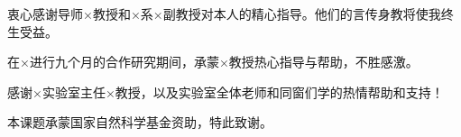 \begin{acknowledgements}

衷心感谢导师×教授和×系×副教授对本人的精心指导。他们的言传身教将使我终生受益。

在×进行九个月的合作研究期间，承蒙×教授热心指导与帮助，不胜感激。

感谢×实验室主任×教授，以及实验室全体老师和同窗们学的热情帮助和支持！

本课题承蒙国家自然科学基金资助，特此致谢。

\end{acknowledgements}

